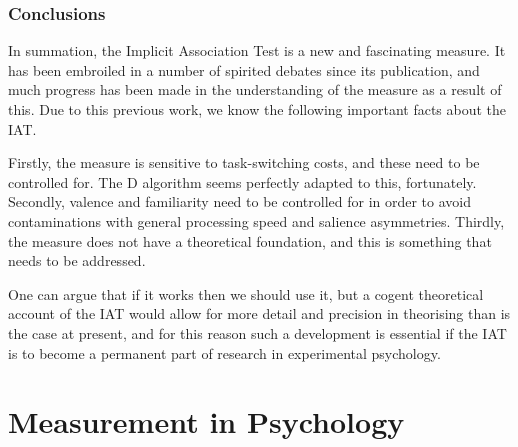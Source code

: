 


\section{Conclusions}
\label{sec:conclusions}


In summation, the Implicit Association Test is a new and fascinating measure. It has been embroiled in a number of spirited debates since its publication, and much progress has been made in the understanding of the measure as a result of this. Due to this previous work, we know the following important facts about the IAT. 

Firstly, the measure is sensitive to task-switching costs, and these need to be controlled for. The D algorithm seems perfectly adapted to this, fortunately. Secondly, valence and familiarity need to be controlled for in order to avoid contaminations with general processing speed and salience asymmetries. Thirdly, the measure does not have a theoretical foundation, and this is something that needs to be addressed. 

One can argue that if it works then we should use it, but a cogent theoretical account of the IAT would allow for more detail and precision in theorising  than is the case at present, and for this reason such a development is essential if the IAT is to become a permanent part of research in experimental psychology.

\part{Measurement in Psychology}
\label{part:meas-psych}

